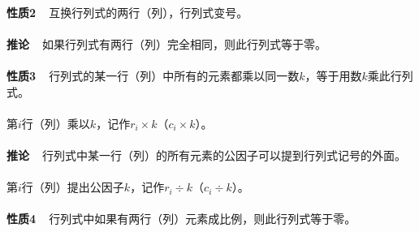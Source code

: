 \paragraph{}
\textbf{性质2~~}互换行列式的两行（列），行列式变号。

\paragraph{}
\textbf{推论~~}如果行列式有两行（列）完全相同，则此行列式等于零。

\paragraph{}
\textbf{性质3~~}行列式的某一行（列）中所有的元素都乘以同一数$k$，等于用数$k$乘此行列式。

\paragraph{}
第$i$行（列）乘以$k$，记作$r_i \times k$（$c_i \times k$）。

\paragraph{}
\textbf{推论~~}行列式中某一行（列）的所有元素的公因子可以提到行列式记号的外面。

\paragraph{}
第$i$行（列）提出公因子$k$，记作$r_i \div k$（$c_i \div k$）。

\paragraph{}
\textbf{性质4~~}行列式中如果有两行（列）元素成比例，则此行列式等于零。

